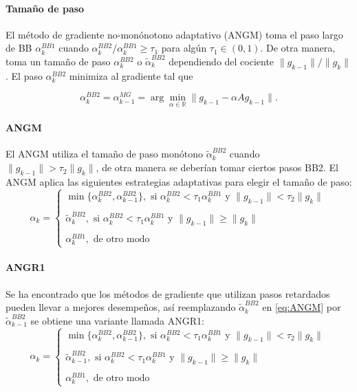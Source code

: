 \begin{frame}{\insertsectionhead}
    \framesubtitle{Tamaño de paso}
    El método de gradiente no-monónotono adaptativo (ANGM) toma el paso largo de BB $\alpha_k^{BB1}$ cuando $\alpha_k^{BB2}/\alpha_k^{BB1}\geq \tau_1$ para algún $\tau_1\in(0,1)$. De otra manera, toma un tamaño de paso $\alpha_k^{BB2}$ o $\tilde{\alpha}_k^{BB2}$ dependiendo del cociente $\|g_{k-1}\|/\|g_k\|$. El paso $\alpha_k^{BB2}$ minimiza al gradiente tal que

    \begin{equation*}
        \alpha_k^{BB2}=\alpha_{k-1}^{MG} =\arg\min_{\alpha\in\mathbb{R}}{\|g_{k-1}-\alpha Ag_{k-1}\|}.
    \end{equation*}
\end{frame}

\begin{frame}{\insertsectionhead}
    \framesubtitle{ANGM}
    El ANGM utiliza el tamaño de paso monótono $\tilde{\alpha}_k^{BB2}$ cuando $\|g_{k-1}\|>\tau_2\|g_k\|$, de otra manera se deberían tomar ciertos pasos BB2.
    El ANGM aplica las siguientes estrategias adaptativas para elegir el tamaño de paso:
    \begin{equation}
        \alpha_k =\begin{cases} \min\{\alpha_k^{BB2}, \alpha_{k-1}^{BB2}\}, \text{ \ si \ } \alpha_k^{BB2}<\tau_1\alpha_k^{BB1}\text{ \ y \ } \|g_{k-1}\|<\tau_2\|g_k\| \\\\
            \tilde{\alpha}_k^{BB2}, \text{ \ si \ } \alpha_k^{BB2} < \tau_1\alpha_k^{BB1} \text{ \ y \ } \|g_{k-1}\|\geq \|g_k\|                    \\\\
            \alpha_k^{BB1}, \text{ \ de otro modo \ }
        \end{cases}
        \label{eq:ANGM}
    \end{equation}
\end{frame}

\begin{frame}{\insertsectionhead}
    \framesubtitle{ANGR1}
    Se ha encontrado que los métodos de gradiente que utilizan pasos retardados pueden llevar a mejores desempeños, así reemplazando $\tilde{\alpha}_k^{BB2}$ en \ref{eq:ANGM} por $\tilde{\alpha}_{k-1}^{BB2}$ se obtiene una variante llamada ANGR1:
    \begin{equation}
        \alpha_k =\begin{cases} \min\{\alpha_k^{BB2}, \alpha_{k-1}^{BB2}\}, \text{ \ si \ } \alpha_k^{BB2}<\tau_1\alpha_k^{BB1}\text{ \ y \ } \|g_{k-1}\|<\tau_2\|g_k\| \\\\
            \tilde{\alpha}_{k-1}^{BB2}, \text{ \ si \ } \alpha_k^{BB2} < \tau_1\alpha_k^{BB1} \text{ \ y \ } \|g_{k-1}\|\geq \|g_k\|                \\\\
            \alpha_k^{BB1}, \text{ \ de otro modo \ }
        \end{cases}
        \label{eq:ANGR1}
    \end{equation}
\end{frame}


